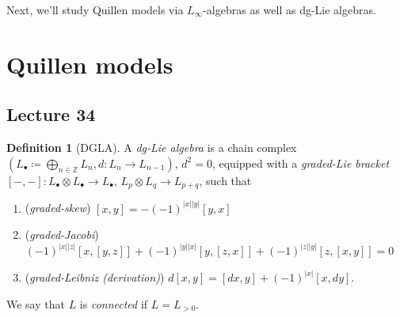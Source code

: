 \documentclass[10pt,letterpaper,cm]{nupset}
\theoremstyle{definition}
\newtheorem{defn}{Definition}[subsection]
\theoremstyle{theorem}
\theoremstyle{remark}
\newcommand{\Z}{\mathbb Z}
\newcommand{\1}{\mathbb{1}}
\newcommand{\0}{\vec 0}
\newcommand{\be}{\begin{enumerate}}
\newcommand{\ee}{\end{enumerate}}
\begin{document}
\medskip

Next, we'll study Quillen models via $L_{\infty}$-algebras as well as dg-Lie algebras.

\section{Quillen models}

\subsection{Lecture 34}

\begin{defn}[DGLA]
A \textit{dg-Lie algebra} is a chain complex $\left(L_{\bullet} \coloneqq \bigoplus_{n \in \Z} L_n, d : L_n \to L_{n-1}\right)$, $d^2 =0$, equipped with a \textit{graded-Lie bracket} $\left[{-}, {-}\right] : L_{\bullet} \otimes L_{\bullet} \to L_{\bullet}$, $L_p \otimes L_q \to L_{p+q}$, such that
\be[label=(\arabic*)]
\item (\textit{graded-skew}) $\left[x,y\right] = {-\left({-1}\right)^{\left\lvert{x}\right\rvert \left\lvert{y}\right\rvert}\left[y,x\right]}$
\item (\textit{graded-Jacobi}) $\left({-1}\right)^{\left\lvert{x}\right\rvert \left\lvert{z}\right\rvert}\left[x, \left[y, z\right]\right] +
\left({-1}\right)^{\left\lvert{y}\right\rvert \left\lvert{x}\right\rvert}\left[y, \left[z, x\right]\right] + 
\left({-1}\right)^{\left\lvert{z}\right\rvert \left\lvert{y}\right\rvert}\left[z, \left[x, y\right]\right]
= 0$
\item (\textit{graded-Leibniz (derivation)}) $d{\left[x,y\right]} = \left[d{x},y\right] + \left({-1}\right)^{\left\lvert{x}\right\rvert}\left[x,d{y}\right]$.
\ee
\end{defn}

We say that $L$ is \textit{connected} if $L = L_{>0}$. 
\end{document}
